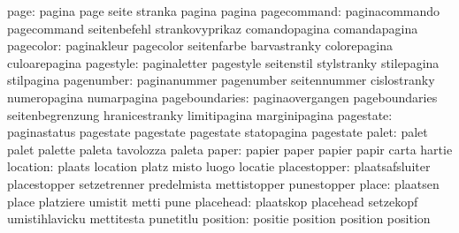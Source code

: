                      page: pagina                    page
                           seite                     stranka
                           pagina                    pagina
              pagecommand: paginacommando            pagecommand
                           seitenbefehl              strankovyprikaz
                           comandopagina             comandapagina
                pagecolor: paginakleur               pagecolor
                           seitenfarbe               barvastranky
                           colorepagina              culoarepagina
                pagestyle: paginaletter              pagestyle
                           seitenstil                stylstranky
                           stilepagina               stilpagina
               pagenumber: paginanummer              pagenumber
                           seitennummer              cislostranky
                           numeropagina              numarpagina
           pageboundaries: paginaovergangen          pageboundaries
                           seitenbegrenzung          hranicestranky
                           limitipagina              marginipagina
                pagestate: paginastatus              pagestate
                           pagestate                 pagestate
                           statopagina               pagestate %
                    palet: palet                     palet
                           palette                   paleta
                           tavolozza                 paleta
                    paper: papier                    paper
                           papier                    papir
                           carta                     hartie
                 location: plaats                    location
                           platz                     misto
                           luogo                     locatie
             placestopper: plaatsafsluiter           placestopper
                           setzetrenner              predelmista
                           mettistopper              punestopper %
                    place: plaatsen                  place
                           platziere                 umistit
                           metti                     pune %
                placehead: plaatskop                 placehead
                           setzekopf                 umistihlavicku
                           mettitesta                punetitlu %
                 position: positie                   position
                           position                  position
